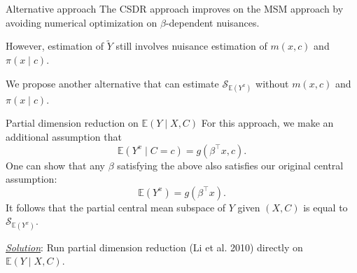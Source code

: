 \documentclass[
  ignorenonframetext,
  aspectratio=169,
  11pt]{beamer}
\begin{document}
\begin{frame}{Alternative approach}
\protect{}\label{alternative-approach}
The CSDR approach improves on the MSM approach by avoiding numerical
optimization on \(\beta\)-dependent nuisances.

\vspace{0.4cm}

However, estimation of \(\widetilde{Y}\) still involves nuisance
estimation of \(m(x,c)\) and \(\pi(x\mid c)\).

\vspace{0.4cm}

We propose another alternative that can estimate
\(\mathcal{S}_{\mathbb{E}(Y^x)}\) without \(m(x,c)\) and
\(\pi(x\mid c)\).
\end{frame}

\begin{frame}{Partial dimension reduction on \(\mathbb{E}(Y\mid X,C)\)}
\protect{}\label{partial-dimension-reduction-on-mathbbeymid-xc}
For this approach, we make an additional assumption that \[
\mathbb{E}(Y^x \mid C=c) = g(\beta^\top x, c).
\] One can show that any \(\beta\) satisfying the above also satisfies
our original central assumption: \[
\mathbb{E}(Y^x) = g(\beta^\top x).
\] It follows that the partial central mean subspace of \(Y\) given
\((X, C)\) is equal to \(\mathcal{S}_{\mathbb{E}(Y^x)}\).

\pause

\vspace{0.34cm}

\underline{\textit{Solution}}: Run partial dimension reduction
{\color{emoryblue}(Li et al. 2010)} directly on
\(\mathbb{E}(Y\mid X,C)\).
\end{frame}
\end{document}
